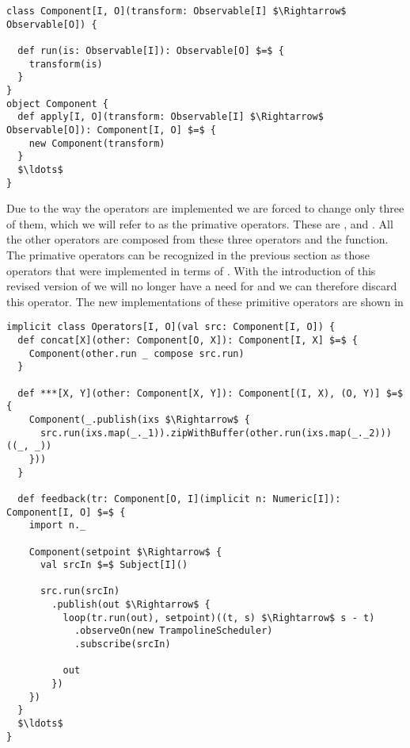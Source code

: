 \begin{minipage}{\linewidth}
\begin{lstlisting}[style=ScalaStyle, caption={Revised version of the \comp interface}, label={lst:component-v2}]
class Component[I, O](transform: Observable[I] $\Rightarrow$ Observable[O]) {

  def run(is: Observable[I]): Observable[O] $=$ {
    transform(is)
  }
}
object Component {
  def apply[I, O](transform: Observable[I] $\Rightarrow$ Observable[O]): Component[I, O] $=$ {
    new Component(transform)
  }
  $\ldots$
}
\end{lstlisting}
\end{minipage}

Due to the way the operators are implemented we are forced to change only three of them, which we will refer to as the primative operators. These are , \code{(***)} and . All the other operators are composed from these three operators and the  function. The primative operators can be recognized in the previous section as those operators that were implemented in terms of . With the introduction of this revised version of \comp we will no longer have a need for  and we can therefore discard this operator.  The new implementations of these primitive operators are shown in 

\begin{minipage}{\linewidth}
\begin{lstlisting}[style=ScalaStyle, caption={Revised implementations of the primitive operators}, label={lst:primative-operator-revisions}]
implicit class Operators[I, O](val src: Component[I, O]) {
  def concat[X](other: Component[O, X]): Component[I, X] $=$ {
    Component(other.run _ compose src.run)
  }
  
  def ***[X, Y](other: Component[X, Y]): Component[(I, X), (O, Y)] $=$ {
    Component(_.publish(ixs $\Rightarrow$ {
      src.run(ixs.map(_._1)).zipWithBuffer(other.run(ixs.map(_._2)))((_, _))
    }))
  }
  
  def feedback(tr: Component[O, I](implicit n: Numeric[I]): Component[I, O] $=$ {
    import n._
    
    Component(setpoint $\Rightarrow$ {
      val srcIn $=$ Subject[I]()
      
      src.run(srcIn)
        .publish(out $\Rightarrow$ {
          loop(tr.run(out), setpoint)((t, s) $\Rightarrow$ s - t)
            .observeOn(new TrampolineScheduler)
            .subscribe(srcIn)

          out
        })
    })
  }
  $\ldots$
}
\end{lstlisting}
\end{minipage}

